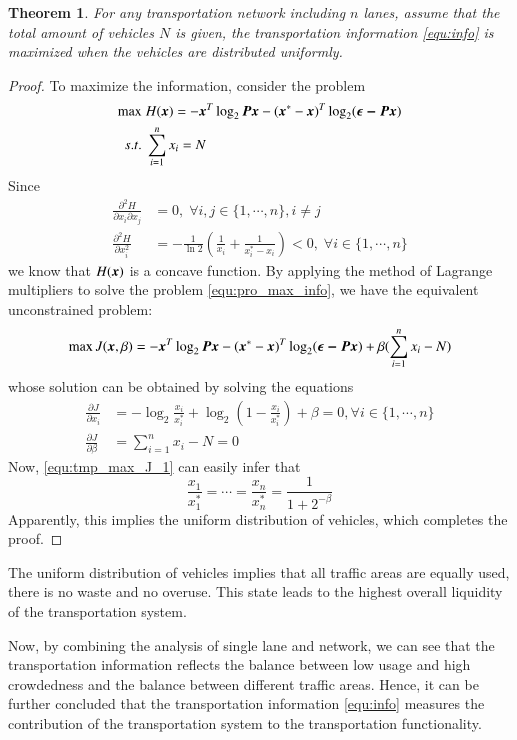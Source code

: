 \documentclass[preprint,authoryear,12pt]{elsarticle}
\renewcommand{\vec}[1]{\mbox{\boldmath$#1$}}
\newcommand{\mat}[1]{\mbox{\boldmath$#1$}}
\newtheorem{thm}{Theorem}
\begin{document}
\begin{thm}\label{thm:info_max}
For any transportation network including $n$ lanes, assume that the
total amount of vehicles $N$ is given, the transportation information
\eqref{equ:info} is maximized when the vehicles are distributed
uniformly.
\end{thm}
\begin{proof}
To maximize the information, consider the problem
\begin{align}\label{equ:pro_max_info}
\max\; &H(\vec{x}) = -\vec{x}^T\log_2\mat{P}\vec{x}
-(\vec{x}^*-\vec{x})^T\log_2(\vec{\epsilon-\mat{P}\vec{x}})\\
s.t.\; &\sum_{i=1}^n x_i = N \nonumber
\end{align}
Since
\begin{align*}
\frac{\partial^2 H}{\partial x_i\partial x_j} &= 0,\;\forall
i,j\in\{1,\cdots,n\},i\neq j\\
\frac{\partial^2 H}{\partial x_i^2} &= -\frac{1}{\ln
2}(\frac{1}{x_i}+\frac{1}{x_i^*-x_i})<0,\;\forall i\in\{1,\cdots,n\}
\end{align*}
we know that $H(\vec{x})$ is a concave function. By applying the
method of Lagrange multipliers to solve the problem
\eqref{equ:pro_max_info}, we have the equivalent unconstrained
problem:
$$\max J(\vec{x},\beta) =
-\vec{x}^T\log_2\mat{P}\vec{x}
-(\vec{x}^*-\vec{x})^T\log_2(\vec{\epsilon-\mat{P}\vec{x}})
+\beta(\sum_{i=1}^n x_i - N)$$
whose solution can be obtained by solving the equations
\begin{align}
\label{equ:tmp_max_J_1}
\frac{\partial J}{\partial x_i} &=
-\log_2\frac{x_i}{x_i^*}+\log_2(1-\frac{x_i}{x_i^*})+\beta =0,
\forall i\in\{1,\cdots,n\}\\
\label{equ:tmp_max_J_2}
\frac{\partial J}{\partial \beta} &= \sum_{i=1}^n x_i - N =0
\end{align}
Now, \eqref{equ:tmp_max_J_1} can easily infer that
$$\frac{x_1}{x_1^*}=\cdots=\frac{x_n}{x_n^*}=\frac{1}{1+2^{-\beta}}
$$
Apparently, this implies the uniform distribution of vehicles, which
completes the proof.
\end{proof}

The uniform distribution of vehicles implies that all traffic areas
are equally used, there is no waste and no overuse. This state leads
to the  highest overall liquidity of the transportation system.

Now, by combining the analysis of single lane and network, we can see
that the transportation information reflects the balance between low
usage and high crowdedness and the balance between different traffic
areas. Hence, it can be further concluded that the transportation
information \eqref{equ:info} measures the contribution of the
transportation system to the transportation functionality.
\end{document}
